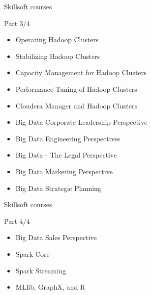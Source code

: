 \begin{frame}{Skillsoft courses}
  \begin{block}{Part 3/4}
    \begin{itemize}
      \item	Operating Hadoop Clusters
      \item	Stabilizing Hadoop Clusters	
      \item	Capacity Management for Hadoop Clusters	
      \item	Performance Tuning of Hadoop Clusters	
      \item	Cloudera Manager and Hadoop Clusters
      \item	Big Data Corporate Leadership Perspective	
      \item	Big Data Engineering Perspectives	
      \item	Big Data - The Legal Perspective	
      \item	Big Data Marketing Perspective
      \item	Big Data Strategic Planning	
    \end{itemize}
  \end{block}
\end{frame}

\begin{frame}{Skillsoft courses}
  \begin{block}{Part 4/4}
    \begin{itemize}
      \item	Big Data Sales Perspective
      \item	Spark Core	
      \item	Spark Streaming	
      \item	MLlib, GraphX, and R
    \end{itemize}
  \end{block}
\end{frame}

